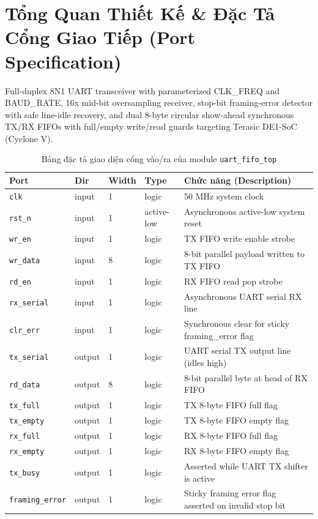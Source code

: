 \documentclass[11pt,a4paper]{article}
\begin{document}
\section{Tổng Quan Thiết Kế \& Đặc Tả Cổng Giao Tiếp (Port Specification)}
Full-duplex 8N1 UART transceiver with parameterized CLK\_FREQ and BAUD\_RATE, 16x mid-bit oversampling receiver, stop-bit framing-error detector with safe line-idle recovery, and dual 8-byte circular show-ahead synchronous TX/RX FIFOs with full/empty write/read guards targeting Terasic DE1-SoC (Cyclone V).

\begin{table}[H]
    \centering
    \small
    \caption{Bảng đặc tả giao diện cổng vào/ra của module \texttt{uart\_fifo\_top}}
    \begin{tabularx}{\textwidth}{@{}llllX@{}}
        \toprule
        \textbf{Port} & \textbf{Dir} & \textbf{Width} & \textbf{Type} & \textbf{Chức năng (Description)} \\
        \midrule
        \texttt{clk} & input & 1 & logic & 50 MHz system clock \\
        \texttt{rst\_n} & input & 1 & active-low & Asynchronous active-low system reset \\
        \texttt{wr\_en} & input & 1 & logic & TX FIFO write enable strobe \\
        \texttt{wr\_data} & input & 8 & logic & 8-bit parallel payload written to TX FIFO \\
        \texttt{rd\_en} & input & 1 & logic & RX FIFO read pop strobe \\
        \texttt{rx\_serial} & input & 1 & logic & Asynchronous UART serial RX line \\
        \texttt{clr\_err} & input & 1 & logic & Synchronous clear for sticky framing\_error flag \\
        \texttt{tx\_serial} & output & 1 & logic & UART serial TX output line (idles high) \\
        \texttt{rd\_data} & output & 8 & logic & 8-bit parallel byte at head of RX FIFO \\
        \texttt{tx\_full} & output & 1 & logic & TX 8-byte FIFO full flag \\
        \texttt{tx\_empty} & output & 1 & logic & TX 8-byte FIFO empty flag \\
        \texttt{rx\_full} & output & 1 & logic & RX 8-byte FIFO full flag \\
        \texttt{rx\_empty} & output & 1 & logic & RX 8-byte FIFO empty flag \\
        \texttt{tx\_busy} & output & 1 & logic & Asserted while UART TX shifter is active \\
        \texttt{framing\_error} & output & 1 & logic & Sticky framing error flag asserted on invalid stop bit \\
        \bottomrule
    \end{tabularx}
\end{table}
\end{document}
